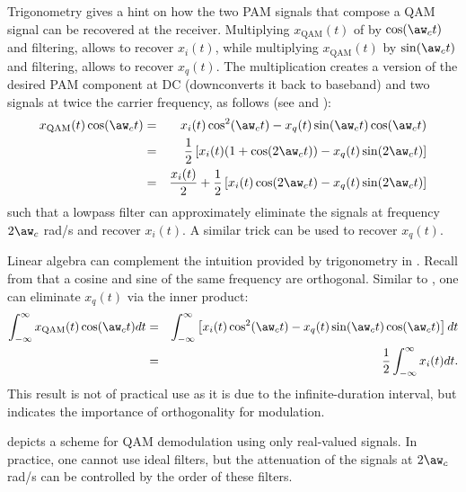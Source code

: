 Trigonometry gives a hint on how the two PAM signals that compose a QAM signal can be recovered at the receiver. Multiplying $x_{\textrm{QAM}}(t)$ of  by $\cos(\aw_c t)$ and filtering, allows to recover $x_i(t)$, while multiplying $x_{\textrm{QAM}}(t)$ by $\sin(\aw_c t)$ and filtering, allows to recover $x_q(t)$.
The multiplication creates a version of the desired PAM component at DC (downconverts it back to baseband) and two signals at twice the carrier frequency, as follows (see  and ):
\begin{eqnarray}
x_{\textrm{QAM}}(t) \cos(\aw_c t) & = & x_i(t) \cos^2(\aw_c t) - x_q(t) \sin(\aw_c t)  \cos(\aw_c t) \nonumber \\
& = & \frac{1}{2} \left[ x_i(t)(1+\cos(2\aw_c t)) - x_q(t) \sin(2\aw_c t) \right] \nonumber \\
& = & \frac{x_i(t)}{2} + \frac{1}{2} \left[ x_i(t)\cos(2\aw_c t) - x_q(t) \sin(2\aw_c t)\right]
\label{eq:qam_recovery}
\end{eqnarray}
such that a lowpass filter can approximately eliminate the signals at frequency $2\aw_c$ rad/s and recover $x_i(t)$. 
A similar trick can be used to recover $x_q(t)$. 

Linear algebra can complement the intuition provided by trigonometry in .
Recall from  that a cosine and sine of the same frequency are orthogonal.
Similar to , one can eliminate $x_q(t)$ via the inner product:
\begin{eqnarray*}
\int_{-\infty}^\infty x_{\textrm{QAM}}(t) \cos(\aw_c t) dt & = & \int_{-\infty}^\infty \left[ x_i(t) \cos^2(\aw_c t) - x_q(t) \sin(\aw_c t)  \cos(\aw_c t) \right] dt\\
& = & \frac{1}{2} \int_{-\infty}^\infty x_{i}(t) dt.
\end{eqnarray*}
This result is not of practical use as it is due to the infinite-duration interval, but indicates the importance of orthogonality for modulation.

 depicts a scheme for QAM demodulation using only real-valued signals.
In practice, one cannot use ideal filters, but the attenuation of the signals at $2\aw_c$ rad/s can be controlled by the order of these filters.

